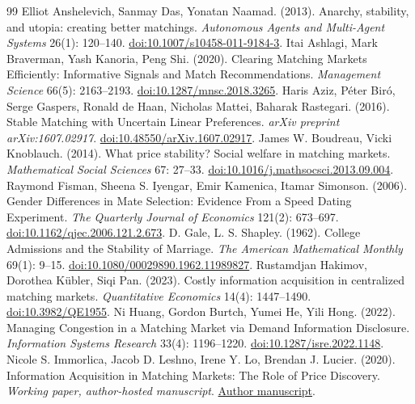 \begin{thebibliography}{99}
Elliot Anshelevich, Sanmay Das, Yonatan Naamad. (2013). Anarchy, stability, and utopia: creating better matchings. \textit{Autonomous Agents and Multi-Agent Systems} 26(1): 120–140. \href{https://link.springer.com/article/10.1007/s10458-011-9184-3}{doi:10.1007/s10458-011-9184-3}.
Itai Ashlagi, Mark Braverman, Yash Kanoria, Peng Shi. (2020). Clearing Matching Markets Efficiently: Informative Signals and Match Recommendations. \textit{Management Science} 66(5): 2163–2193. \href{https://pubsonline.informs.org/doi/10.1287/mnsc.2018.3265}{doi:10.1287/mnsc.2018.3265}.
Haris Aziz, Péter Biró, Serge Gaspers, Ronald de Haan, Nicholas Mattei, Baharak Rastegari. (2016). Stable Matching with Uncertain Linear Preferences. \textit{arXiv preprint arXiv:1607.02917}. \href{https://arxiv.org/abs/1607.02917}{doi:10.48550/arXiv.1607.02917}.
James W. Boudreau, Vicki Knoblauch. (2014). What price stability? Social welfare in matching markets. \textit{Mathematical Social Sciences} 67: 27–33. \href{https://www.sciencedirect.com/science/article/abs/pii/S0165489613000838}{doi:10.1016/j.mathsocsci.2013.09.004}.
Raymond Fisman, Sheena S. Iyengar, Emir Kamenica, Itamar Simonson. (2006). Gender Differences in Mate Selection: Evidence From a Speed Dating Experiment. \textit{The Quarterly Journal of Economics} 121(2): 673–697. \href{https://academic.oup.com/qje/article-abstract/121/2/673/1884033}{doi:10.1162/qjec.2006.121.2.673}.
D. Gale, L. S. Shapley. (1962). College Admissions and the Stability of Marriage. \textit{The American Mathematical Monthly} 69(1): 9–15. \href{https://doi.org/10.1080/00029890.1962.11989827}{doi:10.1080/00029890.1962.11989827}.
Rustamdjan Hakimov, Dorothea Kübler, Siqi Pan. (2023). Costly information acquisition in centralized matching markets. \textit{Quantitative Economics} 14(4): 1447–1490. \href{https://onlinelibrary.wiley.com/doi/full/10.3982/QE1955}{doi:10.3982/QE1955}.
Ni Huang, Gordon Burtch, Yumei He, Yili Hong. (2022). Managing Congestion in a Matching Market via Demand Information Disclosure. \textit{Information Systems Research} 33(4): 1196–1220. \href{https://pubsonline.informs.org/doi/10.1287/isre.2022.1148}{doi:10.1287/isre.2022.1148}.
Nicole S. Immorlica, Jacob D. Leshno, Irene Y. Lo, Brendan J. Lucier. (2020). Information Acquisition in Matching Markets: The Role of Price Discovery. \textit{Working paper, author-hosted manuscript}. \href{https://immorlica.com/pubs/infoAcq.pdf}{Author manuscript}.

\end{thebibliography}
